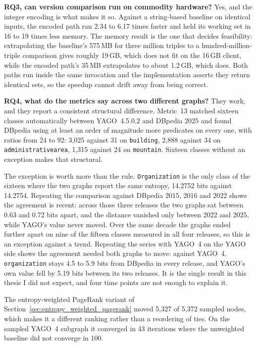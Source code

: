 \textbf{RQ3, can version comparison run on commodity hardware?} Yes, and the
integer encoding is what makes it so. Against a string-based baseline on
identical inputs, the encoded path ran 2.34 to 6.17 times faster and held its
working set in 16 to 19 times less memory. The memory result is the one that
decides feasibility: extrapolating the baseline's 575\,MB for three million
triples to a hundred-million-triple comparison gives roughly 19\,GB, which does
not fit on the 16\,GB client, while the encoded path's 35\,MB extrapolates to
about 1.2\,GB, which does. Both paths run inside the same invocation and the
implementation asserts they return identical sets, so the speedup cannot drift
away from being correct.

\textbf{RQ4, what do the metrics say across two different graphs?} They work, and
they report a consistent structural difference. Metric~13 matched sixteen
classes automatically between YAGO~4.5.0.2 and DBpedia 2025 and found DBpedia
using at least an order of magnitude more predicates on every one, with ratios
from 24 to 92: 3{,}025 against 31 on \texttt{building}, 2{,}888 against 34 on
\texttt{administrativearea}, 1{,}315 against 24 on \texttt{mountain}. Sixteen
classes without an exception makes that structural.

The exception is worth more than the rule. \texttt{Organization} is the only
class of the sixteen where the two graphs report the same entropy, 14.2752 bits
against 14.2754. Repeating the comparison against DBpedia 2015, 2016 and 2022
shows the agreement is recent: across those three releases the two graphs sat
between 0.63 and 0.72 bits apart, and the distance vanished only between 2022
and 2025, while YAGO's value never moved. Over the same decade the graphs ended
further apart on nine of the fifteen classes measured in all four releases, so
this is an exception against a trend. Repeating the series with YAGO~4 on the
YAGO side shows the agreement needed both graphs to move: against YAGO~4,
\texttt{organization} stays 4.5 to 5.9 bits from DBpedia in every release,
and YAGO's own value fell by 5.19 bits between its two releases. It is the
single result in this thesis I did not expect, and four time points are not
enough to explain it.

The entropy-weighted PageRank variant of
Section~\ref{sec:entropy_weighted_pagerank} moved 5{,}327 of 5{,}372 sampled
nodes, which makes it a different ranking rather than a reordering of ties. On
the sampled YAGO~4 subgraph it converged in 43 iterations where the unweighted
baseline did not converge in 100.


